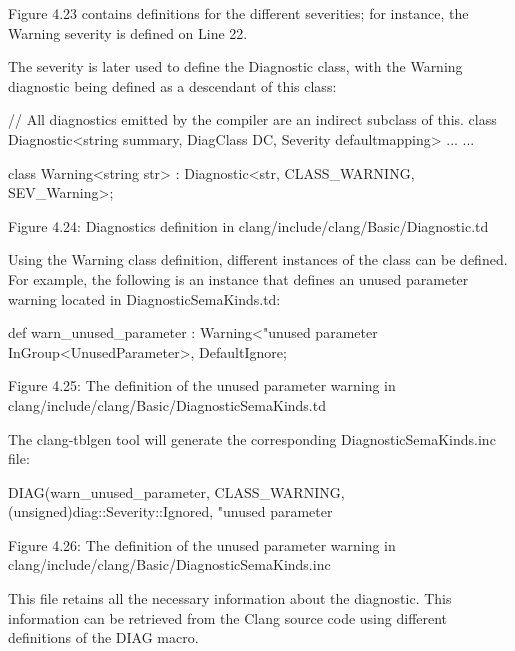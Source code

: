 Figure 4.23 contains definitions for the different severities; for instance, the Warning severity is defined on Line 22.

The severity is later used to define the Diagnostic class, with the Warning diagnostic being defined as a descendant of this class:

\begin{shell}
// All diagnostics emitted by the compiler are an indirect subclass of this.
class Diagnostic<string summary, DiagClass DC, Severity defaultmapping> {
    ...
}
...

class Warning<string str>   : Diagnostic<str, CLASS_WARNING, SEV_Warning>;
\end{shell}

\begin{center}
Figure 4.24: Diagnostics definition in clang/include/clang/Basic/Diagnostic.td
\end{center}

Using the Warning class definition, different instances of the class can be defined. For example, the following is an instance that defines an unused parameter warning located in DiagnosticSemaKinds.td:

\begin{shell}
def warn_unused_parameter : Warning<"unused parameter %
  InGroup<UnusedParameter>, DefaultIgnore;
\end{shell}

\begin{center}
Figure 4.25: The definition of the unused parameter warning in clang/include/clang/Basic/DiagnosticSemaKinds.td
\end{center}

The clang-tblgen tool will generate the corresponding DiagnosticSemaKinds.inc file:

\begin{shell}
DIAG(warn_unused_parameter, CLASS_WARNING, (unsigned)diag::Severity::Ignored, "unused parameter %
\end{shell}

\begin{center}
Figure 4.26: The definition of the unused parameter warning in clang/include/clang/Basic/DiagnosticSemaKinds.inc
\end{center}

This file retains all the necessary information about the diagnostic. This information can be retrieved from the Clang source code using different definitions of the DIAG macro.


